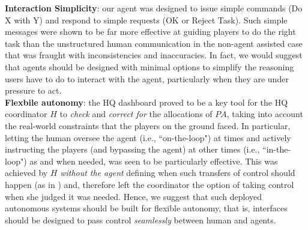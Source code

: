 \noindent \textbf{Interaction Simplicity}: our agent was designed to issue simple commands (Do X with Y) and respond to simple requests (OK or Reject Task). Such simple messages were shown to be far more effective at guiding players to do the right task than the unstructured human communication in the non-agent assisted case that was fraught with inconsistencies and inaccuracies. In fact, we would suggest that agents should be designed with minimal options to simplify the reasoning users have to do to interact with the agent, particularly when they are under pressure to act.\\

\noindent \textbf{Flexbile autonomy}: the HQ dashboard proved to be a key tool for the HQ coordinator $H$ to \emph{check} and \emph{correct for} the allocations of $PA$, taking into account the real-world constraints that the players on the ground faced. In particular, letting the human oversee the agent (i.e., ``on-the-loop") at times and actively instructing  the players (and bypassing the agent) at other times (i.e., ``in-the-loop") as and when needed, was seen to be particularly effective. This was achieved by $H$ \emph{without the agent} defining when such transfers of control should happen (as in \cite{scerri:etal:2005}) and, therefore left the coordinator the option of taking control when she judged it was needed. Hence, we suggest that such deployed autonomous systems should be built for flexible autonomy, that is, interfaces should be designed to pass control \emph{seamlessly} between human and agents.


